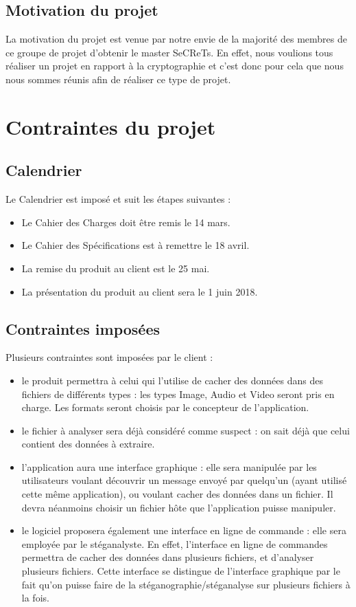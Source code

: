 \documentclass[11pt]{article}
\begin{document}
\subsection{Motivation du projet}

La motivation du projet est venue par notre envie de la majorité des membres de ce groupe de projet d'obtenir le master SeCReTs. 
En effet, nous voulions tous réaliser un projet en rapport à la cryptographie et c'est donc pour cela que nous nous sommes réunis afin de réaliser ce type de projet. 

\section{Contraintes du projet}

\subsection{Calendrier}

Le Calendrier est imposé et suit les étapes suivantes : 

\begin {itemize}
\item Le Cahier des Charges doit être remis le 14 mars. 
\item Le Cahier des Spécifications est à remettre le 18 avril. 
\item La remise du produit au client est le 25 mai. 
\item La présentation du produit au client sera le 1 juin 2018.  
\end{itemize}


\subsection{Contraintes imposées}
Plusieurs contraintes sont imposées par le client : 
\begin{itemize}
\item le produit permettra à celui qui l'utilise de cacher des données dans des fichiers de différents types : les types Image, Audio et Video seront pris en charge. Les formats seront choisis par le concepteur de l'application. 
\item le fichier à analyser sera déjà considéré comme suspect : on sait déjà que celui contient des données à extraire. 
\item l'application aura une interface graphique : elle sera manipulée par les utilisateurs voulant découvrir un message envoyé par quelqu'un (ayant utilisé cette même application), ou voulant cacher des données dans un fichier. 
Il devra néanmoins choisir un fichier hôte que l'application puisse manipuler. 
\item le logiciel proposera également une interface en ligne de commande : elle sera employée par le stéganalyste. En effet, l'interface en ligne de commandes permettra de cacher des données dans plusieurs fichiers, et d'analyser plusieurs fichiers. 
Cette interface se distingue de l'interface graphique par le fait qu'on puisse faire de la stéganographie/stéganalyse sur plusieurs fichiers à la fois. 
\end{itemize}
\end{document}
